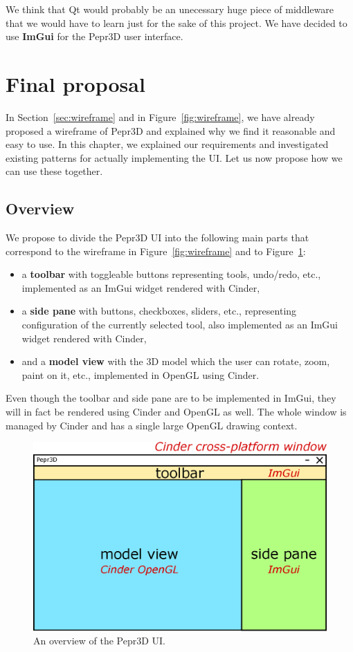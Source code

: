 We think that Qt would probably be an unecessary huge piece of middleware that we would have to learn just for the sake of this project.
We have decided to use \textbf{ImGui} for the Pepr3D user interface.

\section{Final proposal}

In Section~\ref{sec:wireframe} and in Figure~\ref{fig:wireframe}, we have already proposed a wireframe of Pepr3D and explained why we find it reasonable and easy to use.
In this chapter, we explained our requirements and investigated existing patterns for actually implementing the UI.
Let us now propose how we can use these together.

\subsection{Overview}

We propose to divide the Pepr3D UI into the following main parts that correspond to the wireframe in Figure~\ref{fig:wireframe} and to Figure~\ref{fig:uioverview}:
%
\begin{itemize}
\setlength\itemsep{0em}
\item a \textbf{toolbar} with toggleable buttons representing tools, undo/redo, etc., implemented as an ImGui widget rendered with Cinder,
\item a \textbf{side pane} with buttons, checkboxes, sliders, etc., representing configuration of the currently selected tool, also implemented as an ImGui widget rendered with Cinder,
\item and a \textbf{model view} with the 3D model which the user can rotate, zoom, paint on it, etc., implemented in OpenGL using Cinder.
\end{itemize}

Even though the toolbar and side pane are to be implemented in ImGui, they will in fact be rendered using Cinder and OpenGL as well.
The whole window is managed by Cinder and has a single large OpenGL drawing context.

\begin{figure}[h]
	\centering
	\includegraphics[scale=0.65]{images/uioverview.eps}
	\caption{An overview of the Pepr3D UI.}
	\label{fig:uioverview}
\end{figure}

